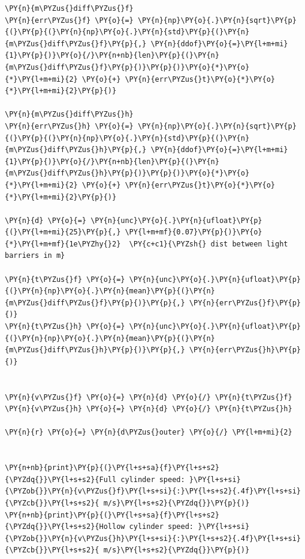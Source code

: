    \begin{tcolorbox}[breakable, size=fbox, boxrule=1pt, pad at break*=1mm,colback=cellbackground, colframe=cellborder]
\begin{Verbatim}[commandchars=\\\{\}]
\PY{n}{m\PYZus{}diff\PYZus{}f}
\PY{n}{err\PYZus{}f} \PY{o}{=} \PY{n}{np}\PY{o}{.}\PY{n}{sqrt}\PY{p}{(}\PY{p}{(}\PY{n}{np}\PY{o}{.}\PY{n}{std}\PY{p}{(}\PY{n}{m\PYZus{}diff\PYZus{}f}\PY{p}{,} \PY{n}{ddof}\PY{o}{=}\PY{l+m+mi}{1}\PY{p}{)}\PY{o}{/}\PY{n+nb}{len}\PY{p}{(}\PY{n}{m\PYZus{}diff\PYZus{}f}\PY{p}{)}\PY{p}{)}\PY{o}{*}\PY{o}{*}\PY{l+m+mi}{2} \PY{o}{+} \PY{n}{err\PYZus{}t}\PY{o}{*}\PY{o}{*}\PY{l+m+mi}{2}\PY{p}{)}

\PY{n}{m\PYZus{}diff\PYZus{}h}
\PY{n}{err\PYZus{}h} \PY{o}{=} \PY{n}{np}\PY{o}{.}\PY{n}{sqrt}\PY{p}{(}\PY{p}{(}\PY{n}{np}\PY{o}{.}\PY{n}{std}\PY{p}{(}\PY{n}{m\PYZus{}diff\PYZus{}h}\PY{p}{,} \PY{n}{ddof}\PY{o}{=}\PY{l+m+mi}{1}\PY{p}{)}\PY{o}{/}\PY{n+nb}{len}\PY{p}{(}\PY{n}{m\PYZus{}diff\PYZus{}h}\PY{p}{)}\PY{p}{)}\PY{o}{*}\PY{o}{*}\PY{l+m+mi}{2} \PY{o}{+} \PY{n}{err\PYZus{}t}\PY{o}{*}\PY{o}{*}\PY{l+m+mi}{2}\PY{p}{)}

\PY{n}{d} \PY{o}{=} \PY{n}{unc}\PY{o}{.}\PY{n}{ufloat}\PY{p}{(}\PY{l+m+mi}{25}\PY{p}{,} \PY{l+m+mf}{0.07}\PY{p}{)}\PY{o}{*}\PY{l+m+mf}{1e\PYZhy{}2}  \PY{c+c1}{\PYZsh{} dist between light barriers in m}

\PY{n}{t\PYZus{}f} \PY{o}{=} \PY{n}{unc}\PY{o}{.}\PY{n}{ufloat}\PY{p}{(}\PY{n}{np}\PY{o}{.}\PY{n}{mean}\PY{p}{(}\PY{n}{m\PYZus{}diff\PYZus{}f}\PY{p}{)}\PY{p}{,} \PY{n}{err\PYZus{}f}\PY{p}{)}
\PY{n}{t\PYZus{}h} \PY{o}{=} \PY{n}{unc}\PY{o}{.}\PY{n}{ufloat}\PY{p}{(}\PY{n}{np}\PY{o}{.}\PY{n}{mean}\PY{p}{(}\PY{n}{m\PYZus{}diff\PYZus{}h}\PY{p}{)}\PY{p}{,} \PY{n}{err\PYZus{}h}\PY{p}{)}


\PY{n}{v\PYZus{}f} \PY{o}{=} \PY{n}{d} \PY{o}{/} \PY{n}{t\PYZus{}f}
\PY{n}{v\PYZus{}h} \PY{o}{=} \PY{n}{d} \PY{o}{/} \PY{n}{t\PYZus{}h}

\PY{n}{r} \PY{o}{=} \PY{n}{d\PYZus{}outer} \PY{o}{/} \PY{l+m+mi}{2}


\PY{n+nb}{print}\PY{p}{(}\PY{l+s+sa}{f}\PY{l+s+s2}{\PYZdq{}}\PY{l+s+s2}{Full cylinder speed: }\PY{l+s+si}{\PYZob{}}\PY{n}{v\PYZus{}f}\PY{l+s+si}{:}\PY{l+s+s2}{.4f}\PY{l+s+si}{\PYZcb{}}\PY{l+s+s2}{ m/s}\PY{l+s+s2}{\PYZdq{}}\PY{p}{)}
\PY{n+nb}{print}\PY{p}{(}\PY{l+s+sa}{f}\PY{l+s+s2}{\PYZdq{}}\PY{l+s+s2}{Hollow cylinder speed: }\PY{l+s+si}{\PYZob{}}\PY{n}{v\PYZus{}h}\PY{l+s+si}{:}\PY{l+s+s2}{.4f}\PY{l+s+si}{\PYZcb{}}\PY{l+s+s2}{ m/s}\PY{l+s+s2}{\PYZdq{}}\PY{p}{)}


\end{Verbatim}
\end{tcolorbox}
